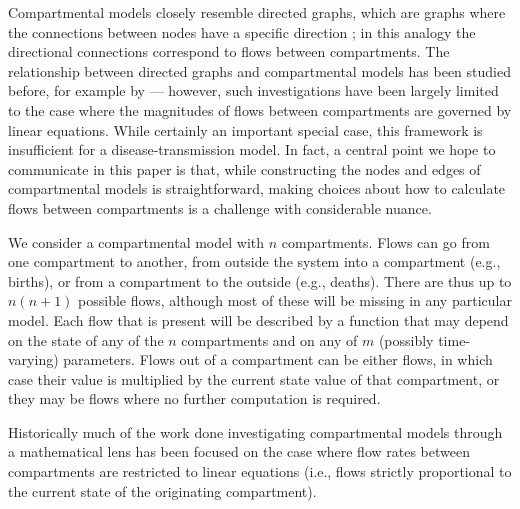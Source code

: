 Compartmental models closely resemble directed graphs, which are graphs where the connections between nodes have a specific direction \citep{roberts2009applied}; in this analogy the directional connections correspond to flows between compartments. The relationship between directed graphs and compartmental models has been studied before, for example by \cite{walter1999compartmental} --- however, such investigations have been largely limited to the case where the magnitudes of flows between compartments are governed by linear equations. While certainly an important special case, this framework is insufficient for a disease-transmission model. In fact, a central point we hope to communicate in this paper is that, while constructing the nodes and edges of compartmental models is straightforward, making choices about how to calculate flows between compartments is a challenge with considerable nuance.

We consider a compartmental model with $n$ compartments. Flows can go from one compartment to another, from outside the system into a compartment (e.g., births), or from a compartment to the outside (e.g., deaths). There are thus up to $n(n+1)$ possible flows, although most of these will be missing in any particular model. Each flow that is present will be described by a function that may depend on the state of any of the $n$ compartments and on any of $m$ (possibly time-varying) parameters. Flows out of a compartment can be either  flows, in which case their value is multiplied by the current state value of that compartment, or they may be  flows where no further computation is required.

Historically much of the work done investigating compartmental models through a mathematical lens has been focused on the case where flow rates between compartments are restricted to linear equations (i.e., flows strictly proportional to the current state of the originating compartment).